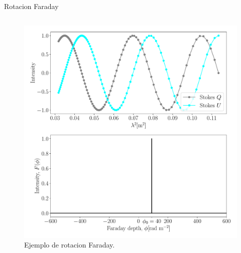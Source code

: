 \documentclass[xetex,aspectratio=169]{beamer}
\begin{document}
	\begin{frame}{Rotacion Faraday}
		\begin{columns}
			
			\begin{column}{0.55\textwidth}
				
				
				
				
				\begin{figure}
					\centering
					\includegraphics[width=\textwidth, height=.7\textheight, keepaspectratio]{figures/faraday_rotation/simulation.pdf}
					\caption*{Ejemplo de rotacion Faraday.}
				\end{figure}
				

\end{column}
\end{columns}
\end{frame}
\end{document}
